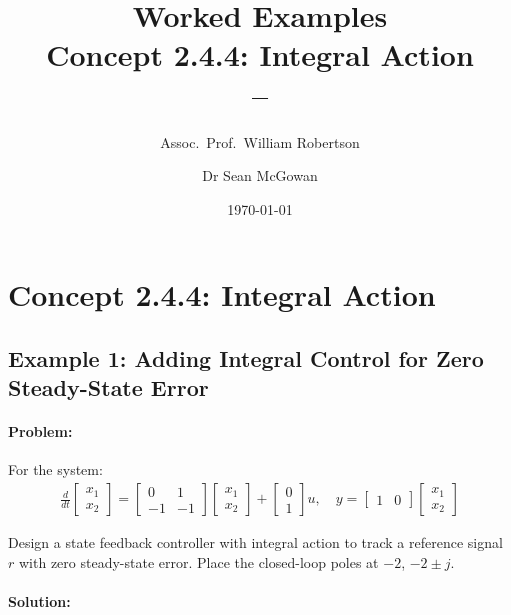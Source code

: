 \documentclass[11pt,a4paper]{article}
\title{\textbf{Worked Examples}\\[0.5em]
\large Concept 2.4.4: Integral Action\\[0.3em]
\normalsize \coursesubtitle{} -- \coursetitle}
\author{Assoc.\ Prof.\ William Robertson \and Dr Sean McGowan}
\date{\today}
\begin{document}
\maketitle
\tableofcontents
\newpage

\section{Concept 2.4.4: Integral Action}

\subsection{Example 1: Adding Integral Control for Zero Steady-State Error}

\paragraph{Problem:} For the system:
\begin{align}
  \frac{d}{dt}\begin{bmatrix} x_1 \\ x_2 \end{bmatrix} = \begin{bmatrix} 0 & 1 \\ -1 & -1 \end{bmatrix}\begin{bmatrix} x_1 \\ x_2 \end{bmatrix} + \begin{bmatrix} 0 \\ 1 \end{bmatrix}u, \quad y = \begin{bmatrix} 1 & 0 \end{bmatrix}\begin{bmatrix} x_1 \\ x_2 \end{bmatrix}
\end{align}

Design a state feedback controller with integral action to track a reference signal $r$ with zero steady-state error. Place the closed-loop poles at $-2$, $-2 \pm j$.

\paragraph{Solution:}
\end{document}
